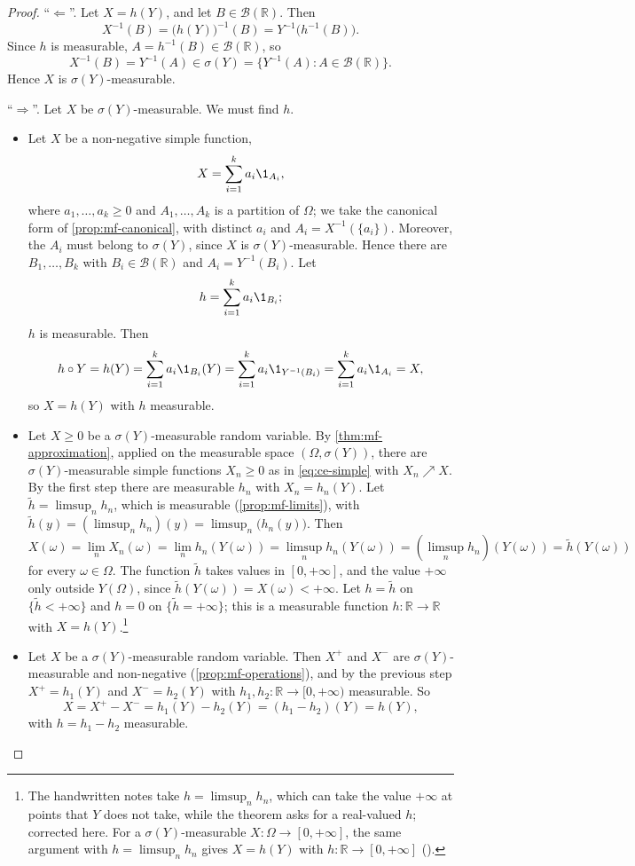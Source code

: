 \begin{proof}
``$\Leftarrow$''. Let $X=h(Y)$, and let $B\in\mathcal B(\mathbb R)$. Then
\[
  X^{-1}(B)=\big(h(Y)\big)^{-1}(B)=Y^{-1}\big(h^{-1}(B)\big).
\]
Since $h$ is measurable, $A=h^{-1}(B)\in\mathcal B(\mathbb R)$, so
\[
  X^{-1}(B)=Y^{-1}(A)\in\sigma(Y)=\{Y^{-1}(A):A\in\mathcal B(\mathbb R)\}.
\]
Hence $X$ is $\sigma(Y)$-measurable.

``$\Rightarrow$''. Let $X$ be $\sigma(Y)$-measurable. We must find $h$.
\begin{itemize}
  \item Let $X$ be a non-negative simple function,
    \begin{equation}\label{eq:ce-simple}
      X=\sum_{i=1}^ka_i\1_{A_i},
    \end{equation}
    where $a_1,\dots,a_k\ge0$ and $A_1,\dots,A_k$ is a partition of $\Omega$; we take the canonical
    form of \cref{prop:mf-canonical}, with distinct $a_i$ and $A_i=X^{-1}(\{a_i\})$. Moreover,
    the $A_i$ must belong to $\sigma(Y)$, since $X$ is $\sigma(Y)$-measurable. Hence there are
    $B_1,\dots,B_k$ with $B_i\in\mathcal B(\mathbb R)$ and $A_i=Y^{-1}(B_i)$. Let
    \[
      h=\sum_{i=1}^ka_i\1_{B_i};
    \]
    $h$ is measurable. Then
    \[
      h\circ Y=h(Y)=\sum_{i=1}^ka_i\1_{B_i}(Y)=\sum_{i=1}^ka_i\1_{Y^{-1}(B_i)}=\sum_{i=1}^ka_i\1_{A_i}=X,
    \]
    so $X=h(Y)$ with $h$ measurable.
  \item Let $X\ge0$ be a $\sigma(Y)$-measurable random variable. By \cref{thm:mf-approximation},
    applied on the measurable space $(\Omega,\sigma(Y))$, there are $\sigma(Y)$-measurable
    simple functions $X_n\ge0$ as in \eqref{eq:ce-simple} with $X_n\nearrow X$. By the first
    step there are measurable $h_n$ with $X_n=h_n(Y)$. Let $\tilde h=\limsup_nh_n$, which is
    measurable (\cref{prop:mf-limits}), with $\tilde h(y)=(\limsup_nh_n)(y)=\limsup_n\big(h_n(y)\big)$.
    Then
    \[
      X(\omega)=\lim_nX_n(\omega)=\lim_nh_n(Y(\omega))=\limsup_nh_n(Y(\omega))
      =(\limsup_nh_n)(Y(\omega))=\tilde h(Y(\omega))
    \]
    for every $\omega\in\Omega$. The function $\tilde h$ takes values in $[0,+\infty]$, and the
    value $+\infty$ only outside
    $Y(\Omega)$, since $\tilde h(Y(\omega))=X(\omega)<+\infty$. Let $h=\tilde h$ on
    $\{\tilde h<+\infty\}$ and $h=0$ on $\{\tilde h=+\infty\}$; this is a measurable function
    $h:\mathbb R\to\mathbb R$ with $X=h(Y)$.\footnote{The handwritten notes take
    $h=\limsup_nh_n$, which can take the value $+\infty$ at points that $Y$ does not take, while
    the theorem asks for a real-valued $h$; corrected here. For a $\sigma(Y)$-measurable
    $X:\Omega\to[0,+\infty]$, the same argument with $h=\limsup_nh_n$ gives $X=h(Y)$ with
    $h:\mathbb R\to[0,+\infty]$ ().}
  \item Let $X$ be a $\sigma(Y)$-measurable random variable. Then $X^+$ and $X^-$ are
    $\sigma(Y)$-measurable and non-negative (\cref{prop:mf-operations}), and by the previous
    step $X^+=h_1(Y)$ and $X^-=h_2(Y)$ with $h_1,h_2:\mathbb R\to[0,+\infty)$ measurable. So
    \[
      X=X^+-X^-=h_1(Y)-h_2(Y)=(h_1-h_2)(Y)=h(Y),
    \]
    with $h=h_1-h_2$ measurable. \qedhere
\end{itemize}
\end{proof}

